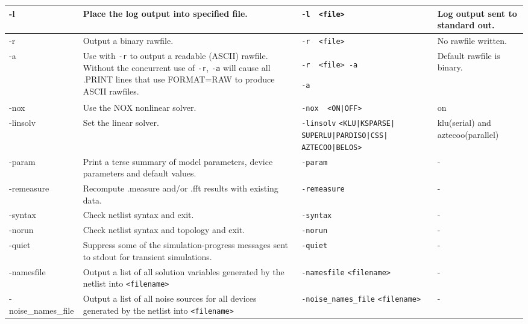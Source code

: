 \begin{longtable}[h] {>{\raggedright\small}m{1.1in}|>{\raggedright\small}m{2in}|>{\raggedright\small}m{1.5in}|>{\raggedright\let\\\tabularnewline\small}m{1in}}
-l &
Place the log output into specified file. &
\verb+-l  <file>+ &
Log output sent to standard out. \\ \hline

-r &
Output a binary rawfile. &
\verb+-r  <file>+ &
No rawfile written. \\ \hline

-a &
Use with \verb+-r+ to output a readable (ASCII) rawfile.
Without the concurrent use of \verb+-r+, \verb+-a+
will cause all .PRINT lines that use FORMAT=RAW to produce
ASCII rawfiles. &
\verb+-r  <file> -a+

\verb+-a+ &
Default rawfile is binary. \\ \hline

-nox &
Use the NOX nonlinear solver. &
\verb+-nox  <ON|OFF>+ &
on \\ \hline

-linsolv &
Set the linear solver. &
\verb+-linsolv+
\verb+<KLU|KSPARSE|+
\verb+SUPERLU|PARDISO|CSS|+
\verb+AZTECOO|BELOS>+ &
klu(serial) and aztecoo(parallel) \\ \hline

-param &
Print a terse summary of model parameters, device parameters and default values. &
\verb+-param+ &
- \\ \hline

-remeasure &
Recompute .measure and/or .fft results with existing data. &
\verb+-remeasure+ &
- \\ \hline

-syntax &
Check netlist syntax and exit.&
\verb+-syntax+ &
- \\ \hline

-norun &
Check netlist syntax and topology and exit. &
\verb+-norun+ &
- \\ \hline

-quiet &
Suppress some of the simulation-progress messages
sent to stdout for transient simulations. &
\verb+-quiet+ &
- \\ \hline

-namesfile &
Output a list of all solution variables generated by the netlist
into \tt{<filename>} &
\verb+-namesfile+
\verb+<filename>+ &
- \\ \hline

-noise\_names\_file &
Output a list of all noise sources for all devices generated by the netlist
into \tt{<filename>} &
\verb+-noise_names_file+
\verb+<filename>+ &
- \\ \hline


\end{longtable}
